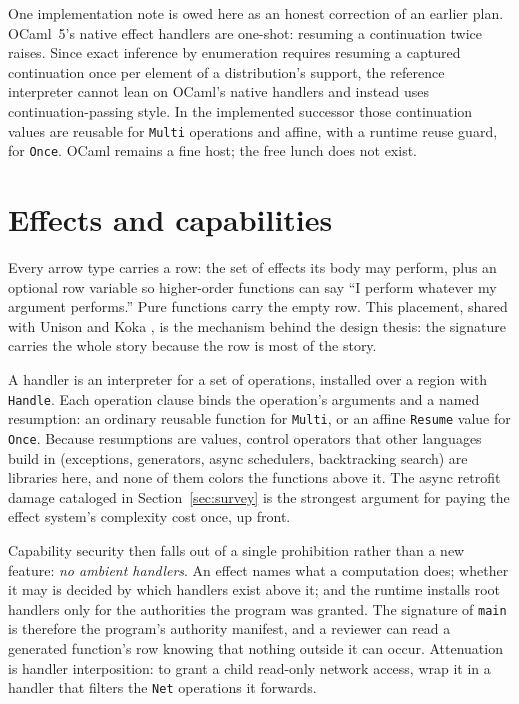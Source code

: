 \documentclass[11pt]{article}
\begin{document}
One implementation note is owed here as an honest correction of an earlier plan. OCaml~5's native effect handlers are one-shot: resuming a continuation twice raises. Since exact inference by enumeration requires resuming a captured continuation once per element of a distribution's support, the reference interpreter cannot lean on OCaml's native handlers and instead uses continuation-passing style. In the implemented successor those continuation values are reusable for \texttt{Multi} operations and affine, with a runtime reuse guard, for \texttt{Once}. OCaml remains a fine host; the free lunch does not exist.

\section{Effects and capabilities}
\label{sec:effects}

Every arrow type carries a row: the set of effects its body may perform, plus an optional row variable so higher-order functions can say ``I perform whatever my argument performs.'' Pure functions carry the empty row. This placement, shared with Unison and Koka \cite{leijen2017}, is the mechanism behind the design thesis: the signature carries the whole story because the row is most of the story.

A handler is an interpreter for a set of operations, installed over a region with \texttt{Handle}. Each operation clause binds the operation's arguments and a named resumption: an ordinary reusable function for \texttt{Multi}, or an affine \texttt{Resume} value for \texttt{Once}. Because resumptions are values, control operators that other languages build in (exceptions, generators, async schedulers, backtracking search) are libraries here, and none of them colors the functions above it. The async retrofit damage cataloged in Section~\ref{sec:survey} is the strongest argument for paying the effect system's complexity cost once, up front.

Capability security then falls out of a single prohibition rather than a new feature: \emph{no ambient handlers}. An effect names what a computation does; whether it may is decided by which handlers exist above it; and the runtime installs root handlers only for the authorities the program was granted. The signature of \texttt{main} is therefore the program's authority manifest, and a reviewer can read a generated function's row knowing that nothing outside it can occur. Attenuation is handler interposition: to grant a child read-only network access, wrap it in a handler that filters the \texttt{Net} operations it forwards.
\end{document}
